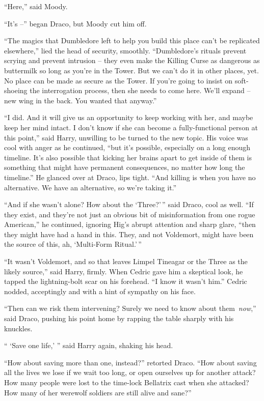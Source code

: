 ``Here,'' said Moody.

``It's --'' began Draco, but Moody cut him off.

``The magics that Dumbledore left to help you build this place can't be
replicated elsewhere,'' lied the head of security, smoothly.
``Dumbledore's rituals prevent scrying and prevent intrusion -- they
even make the Killing Curse as dangerous as buttermilk so long as you're
in the Tower. But we can't do it in other places, yet. No place can be
made as secure as the Tower. If you're going to insist on soft-shoeing
the interrogation process, then she needs to come here. We'll expand --
new wing in the back. You wanted that anyway.''

``I did. And it will give us an opportunity to keep working with her,
and maybe keep her mind intact. I don't know if she can become a
fully-functional person at this point,'' said Harry, unwilling to be
turned to the new topic. His voice was cool with anger as he continued,
``but it's possible, especially on a long enough timeline. It's also
possible that kicking her brains apart to get inside of them is
something that might have permanent consequences, no matter how long the
timeline.'' He glanced over at Draco, lips tight. ``And killing is when
you have no alternative. We have an alternative, so we're taking it.''

``And if she wasn't alone? How about the `Three?'\,'' said Draco, cool
as well. ``If they exist, and they're not just an obvious bit of
misinformation from one rogue American,'' he continued, ignoring Hig's
abrupt attention and sharp glare, ``then they might have had a hand in
this. They, and not Voldemort, might have been the source of this, ah,
`Multi-Form Ritual.'\,''

``It wasn't Voldemort, and so that leaves Limpel Tineagar or the Three
as the likely source,'' said Harry, firmly. When Cedric gave him a
skeptical look, he tapped the lightning-bolt scar on his forehead. ``I
know it wasn't him.'' Cedric nodded, acceptingly and with a hint of
sympathy on his face.

``Then can we risk them intervening? Surely we need to know about
them~\emph{now},'' said Draco, pushing his point home by rapping the
table sharply with his knuckles.

`` `Save one life,' '' said Harry again, shaking his head.

``How about saving more than one, instead?'' retorted Draco. ``How about
saving all the lives we lose if we wait too long, or open ourselves up
for another attack? How many people were lost to the time-lock Bellatrix
cast when she attacked? How many of her werewolf soldiers are still
alive and sane?''

